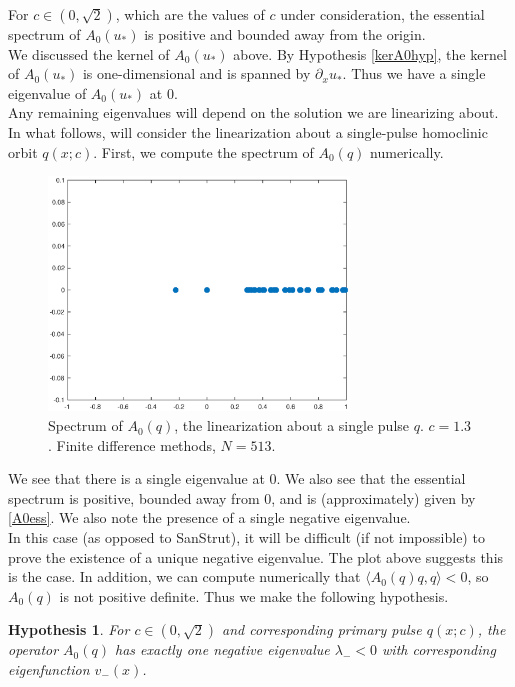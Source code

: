 \documentclass[12pt]{article}
\newtheorem{hypothesis}{Hypothesis}
\begin{document}
For $c \in (0, \sqrt{2})$, which are the values of $c$ under consideration, the essential spectrum of $A_0(u_*)$ is positive and bounded away from the origin.\\

We discussed the kernel of $A_0(u_*)$ above. By Hypothesis \ref{kerA0hyp}, the kernel of $A_0(u_*)$ is one-dimensional and is spanned by $\partial_x u_*$. Thus we have a single eigenvalue of $A_0(u_*)$ at 0. \\

Any remaining eigenvalues will depend on the solution we are linearizing about. In what follows, will consider the linearization about a single-pulse homoclinic orbit $q(x; c)$. First, we compute the spectrum of $A_0(q)$ numerically.

\begin{figure}[H]
\centering
\includegraphics[width=8cm]{specA0.eps}
\caption{Spectrum of $A_0(q)$, the linearization about a single pulse $q$. $c = 1.3$. Finite difference methods, $N = 513$.}
\end{figure}

We see that there is a single eigenvalue at 0. We also see that the essential spectrum is positive, bounded away from 0, and is (approximately) given by \eqref{A0ess}. We also note the presence of a single negative eigenvalue.\\

In this case (as opposed to SanStrut), it will be difficult (if not impossible) to prove the existence of a unique negative eigenvalue. The plot above suggests this is the case. In addition, we can compute numerically that $\langle A_0(q) q, q \rangle < 0$, so $A_0(q)$ is not positive definite. Thus we make the following hypothesis.

\begin{hypothesis}\label{A0neg}
For $c \in (0, \sqrt{2})$ and corresponding primary pulse $q(x; c)$, the operator $A_0(q)$ has exactly one negative eigenvalue $\lambda_- < 0$ with corresponding eigenfunction $v_-(x)$.
\end{hypothesis}
\end{document}

